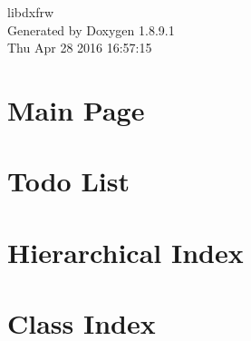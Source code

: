 \documentclass[twoside]{book}
\newcommand{\+}{\discretionary{\mbox{\scriptsize$\hookleftarrow$}}{}{}}
\newcommand{\clearemptydoublepage}{%
  \newpage{\pagestyle{empty}\cleardoublepage}%
}
\begin{document}
\hypersetup{pageanchor=false,
             bookmarks=true,
             bookmarksnumbered=true,
             pdfencoding=unicode
            }
\begin{titlepage}
\vspace*{7cm}
\begin{center}%
{\Large libdxfrw }\\
\vspace*{1cm}
{\large Generated by Doxygen 1.8.9.1}\\
\vspace*{0.5cm}
{\small Thu Apr 28 2016 16:57:15}\\
\end{center}
\end{titlepage}
\clearemptydoublepage
\tableofcontents
\clearemptydoublepage
{}
\hypersetup{pageanchor=true}

\chapter{Main Page}
\label{index}\hypertarget{index}{}
\chapter{Todo List}
\label{dd/da0/todo}
\hypertarget{dd/da0/todo}{}

\chapter{Hierarchical Index}

\chapter{Class Index}

\end{document}
